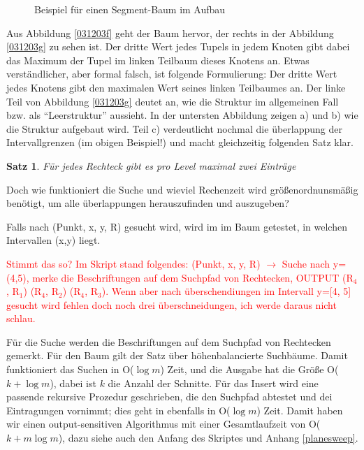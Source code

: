 \documentclass[ngerman,draft,parskip=half*,twoside]{scrreprt}
\theoremstyle{break}
\newtheorem{satz}{Satz}
\begin{document}
\begin{figure}[H]
\centering
 \hspace{1cm}  \hspace{1cm} 
\caption{Beispiel für einen Segment-Baum im Aufbau}
\label{031203i}

\end{figure}

Aus Abbildung \ref{031203f} geht der Baum hervor, der rechts in der Abbildung \ref{031203g} zu sehen ist. Der dritte Wert jedes Tupels
in jedem Knoten
gibt dabei das Maximum der Tupel im linken Teilbaum dieses Knotens an. Etwas verständlicher, aber formal falsch, ist folgende
Formulierung: Der dritte Wert jedes Knotens gibt den maximalen Wert seines linken Teilbaumes an.
Der linke Teil von Abbildung
\ref{031203g} deutet an, wie die Struktur im allgemeinen Fall bzw. als "`Leerstruktur"' aussieht. In der untersten Abbildung zeigen a) und
b) wie die Struktur aufgebaut wird. Teil c) verdeutlicht nochmal die überlappung der Intervallgrenzen (im obigen Beispiel!) und macht
gleichzeitig folgenden Satz klar.

\begin{satz}
Für jedes Rechteck gibt es pro Level maximal zwei Einträge
\end{satz} 

Doch wie funktioniert die Suche und wieviel Rechenzeit wird größenordnunsmäßig benötigt, um alle überlappungen herauszufinden und
auszugeben?

Falls nach (Punkt, x, y, R) gesucht wird, wird im im Baum getestet, in welchen Intervallen (x,y) liegt. 

\textcolor{red}{Stimmt das so? Im
Skript stand folgendes: (Punkt, x, y, R) $\rightarrow$ Suche nach y=(4,5), merke die Beschriftungen auf dem Suchpfad von Rechtecken,
OUTPUT (R$_4$, R$_1$) (R$_4$, R$_2$) (R$_4$, R$_3$).
Wenn aber nach überschendiungen im Intervall y=[4, 5] gesucht wird fehlen doch noch drei überschneidungen, ich werde daraus nicht
schlau. }

Für die Suche werden die Beschriftungen auf dem Suchpfad von Rechtecken gemerkt. Für den Baum gilt der Satz über höhenbalancierte
Suchbäume. Damit funktioniert das Suchen in O($\log m$) Zeit, und die Ausgabe hat die Größe O($k+ \log m$), dabei ist $k$ die Anzahl
der Schnitte. Für das Insert wird eine passende rekursive Prozedur geschrieben, die den Suchpfad abtestet und dei Eintragungen
vornimmt; dies geht in ebenfalls in O($\log m$) Zeit.
Damit haben wir einen output-sensitiven Algorithmus mit einer Gesamtlaufzeit von O($k +m \log m$), dazu siehe auch den Anfang des
Skriptes und Anhang \ref{planesweep}.
\end{document}
